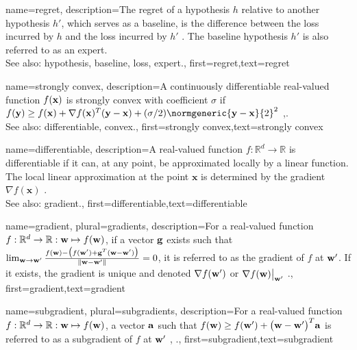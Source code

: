 {name={regret},
	description={The regret of a hypothesis $h$ relative to 
		another hypothesis $h'$, which serves as a baseline, 
		is the difference between the loss incurred by $h$ and the loss 
		incurred by $h'$ \cite{PredictionLearningGames}. 
		The baseline hypothesis $h'$ is also referred to as an expert.
					\\ 
		See also: hypothesis, baseline, loss, expert.},
	first={regret},text={regret} 
}

{name={strongly convex},
	description={A continuously differentiable real-valued 
		function $f({\bf x})$ is strongly convex with coefficient $\sigma$ if $f({\bf y}) \geq f({\bf x}) + \nabla f({\bf x})^{T} ({\bf y} - {\bf x}) + (\sigma/2) \normgeneric{{\bf y} - {\bf x}}{2}^{2}$ \cite{nesterov04},\cite[Sec. B.1.1]{CvxAlgBertsekas}.
					\\ 
		See also: differentiable, convex.},
	first={strongly convex},text={strongly convex} 
}

{name={differentiable},
	description={A real-valued function $f: \mathbb{R}^{d} \rightarrow \mathbb{R}$ 
		is differentiable if it can, at any point, be approximated locally by a linear 
		function. The local linear approximation at the point $\mathbf{x}$ is determined 
		by the gradient $\nabla f ( \mathbf{x})$ \cite{RudinBookPrinciplesMatheAnalysis}.
					\\ 
		See also: gradient.},
	first={differentiable},text={differentiable} 
}

{name={gradient}, plural={gradients},
	description={For a real-valued function 
	$f: \mathbb{R}^{d} \rightarrow \mathbb{R}: {\bf w} \mapsto f({\bf w})$, 
	if a vector ${\bf g}$ exists such that 
	$\lim_{{\bf w} \rightarrow {\bf w}'} \frac{f({\bf w}) - \big(f({\bf w}')+ {\bf g}^{T} ({\bf w}- {\bf w}') \big) }{\| {\bf w}-{\bf w}'\|}=0$, 
	it is referred to as the gradient of $f$ at ${\bf w}'$. If it exists, the gradient is unique and 
	denoted $\nabla f({\bf w}')$ or $\nabla f({\bf w})\big|_{{\bf w}'}$ \cite{RudinBookPrinciplesMatheAnalysis}.},
	first={gradient},text={gradient} 
}

{name={subgradient}, plural={subgradients},
description={For a real-valued function $f: \mathbb{R}^{d} \rightarrow \mathbb{R}: {\bf w} \mapsto f({\bf w})$, 
		a vector ${\bf a}$ such that $f({\bf w}) \geq  f({\bf w}') +\big({\bf w}-{\bf w}' \big)^{T} {\bf a}$ is 
		referred to as a subgradient of $f$ at ${\bf w}'$ \cite{BertCvxAnalOpt}, \cite{BertsekasNonLinProgr}.},
	first={subgradient},text={subgradient} 
}

